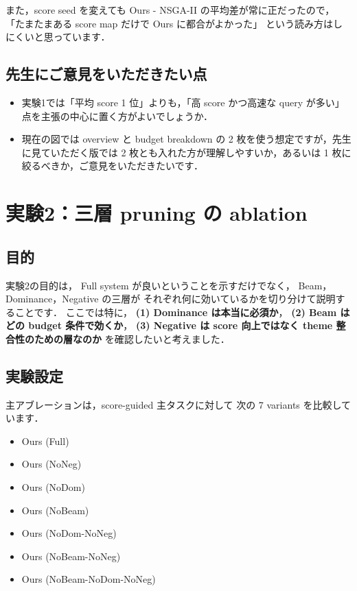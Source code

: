 \documentclass[a4paper,11pt]{article}
\begin{document}
また，score seed を変えても Ours - NSGA-II の平均差が常に正だったので，
「たまたまある score map だけで Ours に都合がよかった」
という読み方はしにくいと思っています．

\subsection*{先生にご意見をいただきたい点}
\begin{itemize}
    \item 実験1では「平均 score 1 位」よりも，「高 score かつ高速な query が多い」点を主張の中心に置く方がよいでしょうか．
    \item 現在の図では overview と budget breakdown の 2 枚を使う想定ですが，先生に見ていただく版では 2 枚とも入れた方が理解しやすいか，あるいは 1 枚に絞るべきか，ご意見をいただきたいです．
\end{itemize}

\clearpage
\section{実験2：三層 pruning の ablation}
\subsection*{目的}
実験2の目的は，
Full system が良いということを示すだけでなく，
Beam，Dominance，Negative の三層が
それぞれ何に効いているかを切り分けて説明することです．
ここでは特に，
\textbf{(1) Dominance は本当に必須か}，
\textbf{(2) Beam はどの budget 条件で効くか}，
\textbf{(3) Negative は score 向上ではなく theme 整合性のための層なのか}
を確認したいと考えました．

\subsection*{実験設定}
主アブレーションは，score-guided 主タスクに対して
次の 7 variants を比較しています．
\begin{itemize}
    \item Ours (Full)
    \item Ours (NoNeg)
    \item Ours (NoDom)
    \item Ours (NoBeam)
    \item Ours (NoDom-NoNeg)
    \item Ours (NoBeam-NoNeg)
    \item Ours (NoBeam-NoDom-NoNeg)
\end{itemize}
\end{document}
